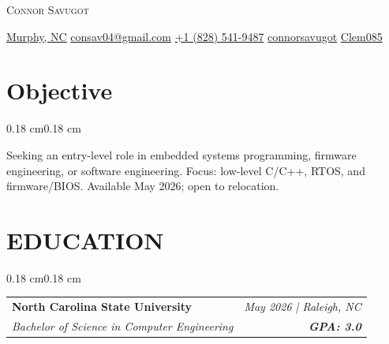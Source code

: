 \documentclass[10pt, letterpaper]{article}
\newenvironment{onecolentry}{
    \begin{adjustwidth}{0.18 cm}{0.18 cm}
}{
    \end{adjustwidth}
}
\newenvironment{header}{
    \setlength{\topsep}{-0.15cm}\par\kern\topsep\centering\linespread{1.16}
}{
    \par\kern\topsep
}
\let\hrefWithoutArrow\href
\renewcommand{\href}[2]{\hrefWithoutArrow{#1}{#2}}
\begin{document}
\newcommand{\AND}{\unskip
    \cleaders\copy\ANDbox\hskip\wd\ANDbox
    \ignorespaces
}
\newsavebox\ANDbox
\sbox\ANDbox{}

\begin{header}
    \fontsize{24}{26}\selectfont\scshape Connor Savugot
\end{header}
\begin{center}
{\fontsize{9}{11}\selectfont
\href{https://maps.app.goo.gl/6EoyjWCwyq2M3qoJ6}{\faMapMarker*\enspace Murphy, NC}\hspace{0.9em}%
\href{mailto:consav04@gmail.com}{\faEnvelope\enspace consav04@gmail.com}\hspace{0.9em}%
\href{tel:+1-828-541-9487}{\faPhone\enspace +1 (828) 541-9487}\hspace{0.9em}%
\href{https://linkedin.com/in/connorsavugot}{\faLinkedinIn\enspace connorsavugot}\hspace{0.9em}%
\href{https://github.com/Clem085}{\faGithub\enspace Clem085}
}
\end{center}

\section{Objective}
\begin{onecolentry}
Seeking an entry-level role in embedded systems programming, firmware engineering, or software engineering. \newline Focus: low-level C/C++, RTOS, and firmware/BIOS. Available May 2026; open to relocation.
\end{onecolentry}
\vspace{7pt}

\section{EDUCATION}
\begin{onecolentry}
\begin{tabularx}{\textwidth}{@{}X r@{}}
    \textbf{North Carolina State University} & \textit{May 2026 \;\;|\;\; Raleigh, NC} \\
    \textit{Bachelor of Science in Computer Engineering} & \textbf{\textit{GPA: 3.0}} \\
\end{tabularx}
\end{onecolentry}
\vspace{5pt}
\end{document}
